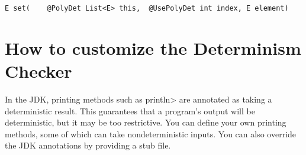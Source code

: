 \begin{Verbatim}
E set(    @PolyDet List<E> this,  @UsePolyDet int index, E element)
\end{Verbatim}



\section{How to customize the Determinism Checker\label{determinism-customization}}

In the JDK, printing methods such as \<println> are annotated as taking a
deterministic result.  This guarantees that a program's output will be
deterministic, but it may be too restrictive.  You can define your own
printing methods, some of which can take nondeterministic inputs.  You can
also override the JDK annotations by providing a stub file.


